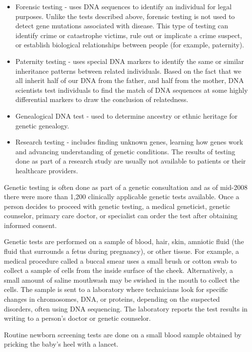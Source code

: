 \begin{itemize}
\tightlist
\item
  Forensic testing - uses DNA sequences to identify an individual for legal purposes. Unlike the tests described above, forensic testing is not used to detect gene mutations associated with disease. This type of testing can identify crime or catastrophe victims, rule out or implicate a crime suspect, or establish biological relationships between people (for example, paternity).
\item
  Paternity testing - uses special DNA markers to identify the same or similar inheritance patterns between related individuals. Based on the fact that we all inherit half of our DNA from the father, and half from the mother, DNA scientists test individuals to find the match of DNA sequences at some highly differential markers to draw the conclusion of relatedness.
\item
  Genealogical DNA test - used to determine ancestry or ethnic heritage for genetic genealogy.
\item
  Research testing - includes finding unknown genes, learning how genes work and advancing understanding of genetic conditions. The results of testing done as part of a research study are usually not available to patients or their healthcare providers.
\end{itemize}

Genetic testing is often done as part of a genetic consultation and as of mid-2008 there were more than 1,200 clinically applicable genetic tests available. Once a person decides to proceed with genetic testing, a medical geneticist, genetic counselor, primary care doctor, or specialist can order the test after obtaining informed consent.

Genetic tests are performed on a sample of blood, hair, skin, amniotic fluid (the fluid that surrounds a fetus during pregnancy), or other tissue. For example, a medical procedure called a buccal smear uses a small brush or cotton swab to collect a sample of cells from the inside surface of the cheek. Alternatively, a small amount of saline mouthwash may be swished in the mouth to collect the cells. The sample is sent to a laboratory where technicians look for specific changes in chromosomes, DNA, or proteins, depending on the suspected disorders, often using DNA sequencing. The laboratory reports the test results in writing to a person's doctor or genetic counselor.

Routine newborn screening tests are done on a small blood sample obtained by pricking the baby's heel with a lancet.

